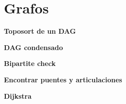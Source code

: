 \section{Grafos}
    \textbf{Toposort de un DAG}
    

    \textbf{DAG condensado}
    

    \textbf{Bipartite check}
    

    \textbf{Encontrar puentes y articulaciones}
    

    \textbf{Dijkstra}
    